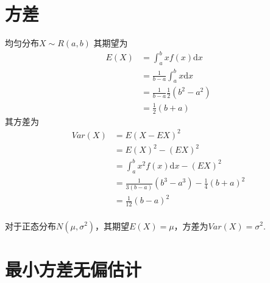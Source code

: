 \section{方差}
均匀分布$X \sim R(a, b)$
其期望为
\begin{equation}
    \begin{split}
        E(X) &= \int_{a}^{b}x f(x) \mathrm{d}x		\\
        &= \frac{1}{b-a}\int_{a}^{b}x\mathrm{d}x	\\
        &= \frac{1}{b-a} \frac{1}{2} (b^2 - a^2)	\\
        &= \frac{1}{2}(b + a)
    \end{split}
\end{equation}
其方差为
\begin{equation}
    \begin{split}
        Var(X) &= E(X - EX)^2  \\
        &= E(X)^2 - (EX)^2 \\
        &= \int_{a}^{b} x^2 f(x) \mathrm{d}x - (EX)^2 \\
        &= \frac{1}{3(b-a)} (b^3 - a^3) - \frac{1}{4}(b+a)^2 \\
        &= \frac{1}{12}(b-a)^2
    \end{split}
\end{equation}
\\
对于正态分布$N(\mu, \sigma ^2)$，其期望$E(X) = \mu$，方差为$Var(X) = \sigma^2$.


\section{最小方差无偏估计}

